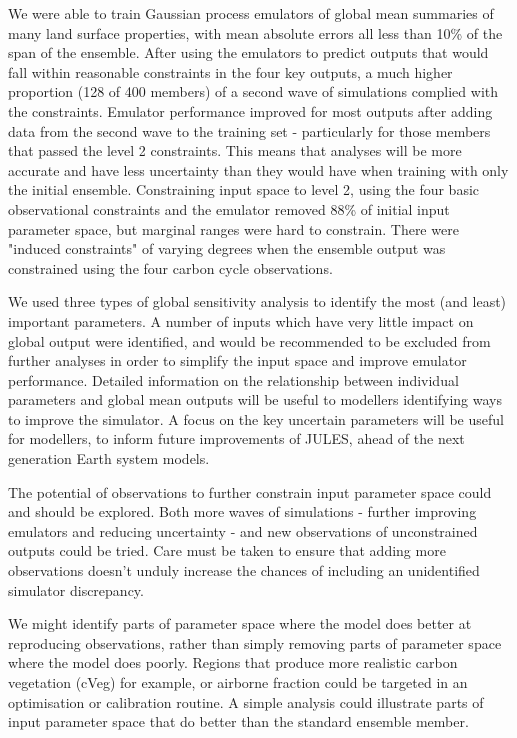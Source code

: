 \documentclass[gmd, manuscript]{copernicus}
\begin{document}
 We were able to train Gaussian process emulators of global mean summaries of many land surface properties, with mean absolute errors all less than 10\% of the span of the ensemble. After using the emulators to predict outputs that would fall within reasonable constraints in the four key outputs, a much higher proportion (128 of 400 members) of a second wave of simulations complied with the constraints. Emulator performance improved for most outputs after adding data from the second wave to the training set - particularly for those members that passed the level 2 constraints. This means that analyses will be more accurate and have less uncertainty than they would have when training with only the initial ensemble. Constraining input space to level 2, using the four basic observational constraints and the emulator removed 88\% of initial input parameter space, but marginal ranges were hard to constrain. There were "induced constraints" of varying degrees when the ensemble output was constrained using the four carbon cycle observations.
    
We used three types of global sensitivity analysis to identify the most (and least) important parameters.  A number of inputs which have very little impact on global output were identified, and would be recommended to be excluded from further analyses in order to simplify the input space and improve emulator performance. Detailed information on the relationship between individual parameters and global mean outputs will be useful to modellers identifying ways to improve the simulator. A focus on the key uncertain parameters will be useful for modellers, to inform future improvements of JULES, ahead of the next generation Earth system models.

The potential of observations to further constrain input parameter space could and should be explored. Both more waves of simulations - further improving emulators and reducing uncertainty - and new observations of unconstrained outputs could be tried.  Care must be taken to ensure that adding more observations doesn't unduly increase the chances of including an unidentified simulator discrepancy.

We might identify parts of parameter space where the model does better at reproducing observations, rather than simply removing parts of parameter space where the model does poorly. Regions that produce more realistic carbon vegetation (cVeg) for example, or airborne fraction could be targeted in an optimisation or calibration routine. A simple analysis could illustrate parts of input parameter space that do better than the standard ensemble member.
\end{document}
